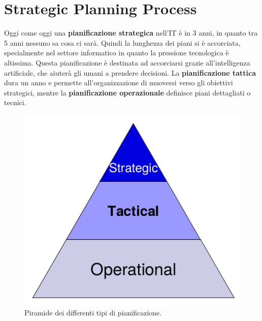\section{Strategic Planning Process}
\label{PG:SPP}

Oggi come oggi una \textbf{pianificazione strategica} nell'IT è in 3 anni, in
quanto tra 5 anni nessuno sa cosa ci sarà. Quindi la lunghezza dei piani si è
accorciata, specialmente nel settore informatico in quanto la pressione
tecnologica è altissima. Questa pianificazione è destinata ad accorciarsi
grazie all'intelligenza artificiale, che aiuterà gli umani a prendere
decisioni. La \textbf{pianificazione tattica} dura un anno e permette
all'organizzazione di muoversi verso gli obiettivi strategici, mentre la
\textbf{pianificazione operazionale} definisce piani dettagliati o tecnici.

\begin{figure}[H]
        \begin{center}
                \includegraphics[scale=0.4]{res/img/planning_process}
        \end{center}
        \caption{Piramide dei differenti tipi di pianificazione.}
\end{figure}

